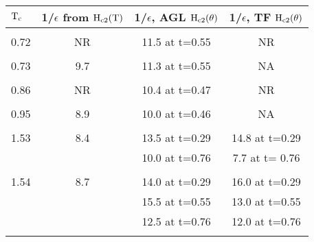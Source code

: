 {\newpage
\clearpage
\samepage \begin{table}%

\label{epstab}
\begin{center}
\begin{tabular}{|l|ccc|}
\hline
$\rm T_c$ & 1/$\epsilon$ from $\rm H_{c2}(T)$ & 1/$\epsilon$, AGL $\rm
H_{c2}(\theta)$ & 1/$\epsilon$, TF $\rm H_{c2}(\theta)$  \\ 
\hline
& & & \\ 
0.72\cite{iye82} & NR & 11.5 at t=0.55 & NR \\ 
& & & \\ 
0.73\cite{iye82} & 9.7 & 11.3 at t=0.55 & NA \\ 
& & & \\ 
0.86\cite{iye82} & NR & 10.4 at t=0.47 & NR \\ 
& & & \\ 
0.95 & 8.9 & 10.0 at t=0.46 & NA \\ 
& & & \\ 
1.53 & 8.4 & 13.5 at t=0.29 & 14.8 at t=0.29 \\ 
& & 10.0 at t=0.76 & 7.7 at t= 0.76 \\ 
& & & \\ 
1.54 & 8.7 & 14.0 at t=0.29 & 16.0 at t=0.29\\ 
& & 15.5 at t=0.55  & 13.0 at t=0.55\\ 
& & 12.5 at t=0.76 & 12.0 at t=0.76\\ 
& & & \\ 
\hline
\end{tabular}
\end{center}
\end{table}
}

{\newpage
\clearpage
\samepage \begin{figure}\vspace{5in}

\label{epstemp}
\end{figure}
}

{\newpage
\clearpage
\samepage \begin{figure}\vspace{5in}

\label{stiiepstemp}
\end{figure}
}

{\newpage
\clearpage
\samepage \begin{figure}\vspace{5.5in}

\label{rbhct}
\end{figure}
}

